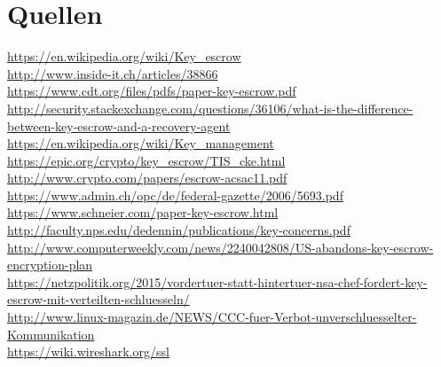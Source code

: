\documentclass[a4paper, 10pt, fleqn]{article}
\begin{document}
\section*{Quellen}
\url{https://en.wikipedia.org/wiki/Key_escrow}\\
\url{http://www.inside-it.ch/articles/38866}\\
\url{https://www.cdt.org/files/pdfs/paper-key-escrow.pdf}\\
\url{http://security.stackexchange.com/questions/36106/what-is-the-difference-between-key-escrow-and-a-recovery-agent}\\
\url{https://en.wikipedia.org/wiki/Key_management}\\
\url{https://epic.org/crypto/key_escrow/TIS_cke.html}\\
\url{http://www.crypto.com/papers/escrow-acsac11.pdf}\\
\url{https://www.admin.ch/opc/de/federal-gazette/2006/5693.pdf} \\ %
\url{https://www.schneier.com/paper-key-escrow.html} \\ %
\url{http://faculty.nps.edu/dedennin/publications/key-concerns.pdf} \\ %
\url{http://www.computerweekly.com/news/2240042808/US-abandons-key-escrow-encryption-plan} \\ %
\url{https://netzpolitik.org/2015/vordertuer-statt-hintertuer-nsa-chef-fordert-key-escrow-mit-verteilten-schluesseln/} \\ %
\url{http://www.linux-magazin.de/NEWS/CCC-fuer-Verbot-unverschluesselter-Kommunikation} \\ %
\url{https://wiki.wireshark.org/ssl}
\end{document}
